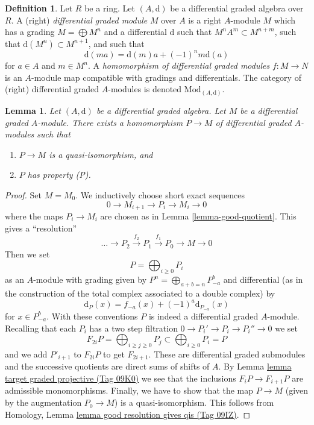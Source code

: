 \documentclass{amsart}
\theoremstyle{plain}
\newtheorem{lemma}[subsection]{Lemma}
\theoremstyle{definition}
\newtheorem{definition}[subsection]{Definition}
\theoremstyle{remark}
\numberwithin{equation}{subsection}
\begin{document}
\begin{definition}
\label{definition-dgm}
Let $R$ be a ring.
Let $(A, \text{d})$ be a differential graded algebra over $R$.
A (right) {\it differential graded module} $M$ over $A$ is a right $A$-module
$M$ which has a grading $M = \bigoplus M^n$ and a differential $\text{d}$
such that $M^n A^m \subset M^{n + m}$, such that
$\text{d}(M^n) \subset M^{n + 1}$, and such that
$$
\text{d}(ma) = \text{d}(m)a + (-1)^n m\text{d}(a)
$$
for $a \in A$ and $m \in M^n$. A
{\it homomorphism of differential graded modules} $f : M \to N$
is an $A$-module map compatible with gradings and differentials.
The category of (right) differential graded $A$-modules is denoted
$\text{Mod}_{(A, \text{d})}$.
\end{definition}

\begin{lemma}
\label{lemma-resolve}
Let $(A, \text{d})$ be a differential graded algebra.
Let $M$ be a differential graded $A$-module. There exists a homomorphism
$P \to M$ of differential graded $A$-modules such that
\begin{enumerate}
\item $P \to M$ is a quasi-isomorphism, and
\item $P$ has property (P).
\end{enumerate}
\end{lemma}

\begin{proof}
Set $M = M_0$. We inductively choose short exact sequences
$$
0 \to M_{i + 1} \to P_i \to M_i \to 0
$$
where the maps $P_i \to M_i$ are chosen as in Lemma \ref{lemma-good-quotient}.
This gives a ``resolution''
$$
\ldots \to P_2 \xrightarrow{f_2} P_1 \xrightarrow{f_1} P_0 \to M \to 0
$$
Then we set
$$
P = \bigoplus\nolimits_{i \geq 0} P_i
$$
as an $A$-module with grading given by
$P^n = \bigoplus_{a + b = n} P_{-a}^b$ and
differential (as in the construction of the total complex associated
to a double complex) by
$$
\text{d}_P(x) = f_{-a}(x) + (-1)^a \text{d}_{P_{-a}}(x)
$$
for $x \in P_{-a}^b$. With these conventions $P$ is indeed a differential
graded $A$-module. Recalling that each $P_i$ has a two step filtration
$0 \to P_i' \to P_i \to P_i'' \to 0$ we set
$$
F_{2i}P = \bigoplus\nolimits_{i \geq j \geq 0} P_j
\subset
\bigoplus\nolimits_{i \geq 0} P_i = P
$$
and we add $P'_{i + 1}$ to $F_{2i}P$ to get $F_{2i + 1}$.
These are differential graded submodules and the successive quotients
are direct sums of shifts of $A$. By
Lemma \href{https://stacks.math.columbia.edu/tag/09K0}{lemma target graded projective (Tag 09K0)} we see that
the inclusions $F_iP \to F_{i + 1}P$ are admissible monomorphisms.
Finally, we have to show that the map $P \to M$ (given by the
augmentation $P_0 \to M$) is a quasi-isomorphism. This follows from
Homology, Lemma \href{https://stacks.math.columbia.edu/tag/09IZ}{lemma good resolution gives qis (Tag 09IZ)}.
\end{proof}
\end{document}
